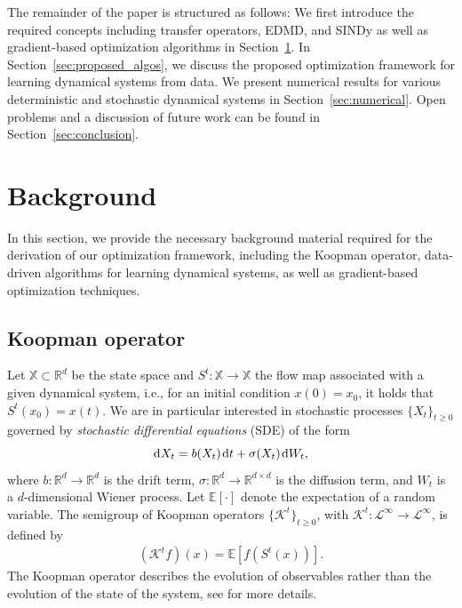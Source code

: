\documentclass
[
    a4paper,
    DIV=11,
    abstract=true,
    11pt,
]
{scrartcl}
\newcommand{\R}{\mathbb{R}}                                      %
\newcommand{\ts}{\hspace*{0.1em}}                                %
\theoremstyle{definition}
\begin{document}
The remainder of the paper is structured as follows: We first introduce the required concepts including transfer operators, EDMD, and SINDy as well as gradient-based optimization algorithms in Section~\ref{sec:background}. In Section~\ref{sec:proposed_algos}, we discuss the proposed optimization framework for learning dynamical systems from data. We present numerical results for various deterministic and stochastic dynamical systems in Section~\ref{sec:numerical}. Open problems and a discussion of future work can be found in Section~\ref{sec:conclusion}.

\section{Background}
\label{sec:background}

In this section, we provide the necessary background material required for the derivation of our optimization framework, including the Koopman operator, data-driven algorithms for learning dynamical systems, as well as gradient-based optimization techniques.

\subsection{Koopman operator}

Let $\mathbb{X} \subset \R^d$ be the state space and $S^t \colon \mathbb{X} \rightarrow \mathbb{X}$ the flow map associated with a given dynamical system, i.e., for an initial condition $ x(0) = x_0 $, it holds that $ S^t(x_0) = x(t)$. We are in particular interested in stochastic processes $ \{X_t\}_{t \geq 0} $ governed by \emph{stochastic differential equations} (SDE) of the form
\begin{equation*}
    \mathrm{d}X_t = b(X_t) \ts \mathrm{d}t + \sigma(X_t) \ts \mathrm{d}W_t,
\end{equation*}
where $ b \colon \R^d \rightarrow \R^d $ is the drift term, $\sigma \colon \R^d \rightarrow \R^{d \times d}$ is the diffusion term, and $ W_t $ is a $ d $-dimensional Wiener process. Let $ \mathbb{E}[\cdot] $ denote the expectation of a random variable. The semigroup of Koopman operators $ \{\mathcal{K}^t\}_{t \ge 0} $, with $\mathcal{K}^t \colon \mathcal{L}^\infty \rightarrow \mathcal{L}^\infty$, is defined by
\begin{align*}
    (\mathcal{K}^tf)(x) = \mathbb{E}[f(S^t(x))].
\end{align*}
The Koopman operator describes the evolution of observables rather than the evolution of the state of the system, see \cite{LaMa94, Mezic05, KKS16, hollingsworth2008stochastic} for more details.
\end{document}
